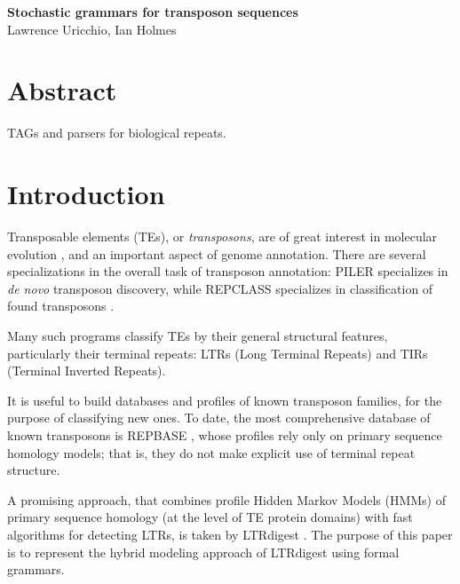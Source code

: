 \documentclass[10pt]{article}
\date{}
\newcommand\titlestring{Stochastic grammars for transposon sequences}
\newcommand\authorstring{
Lawrence Uricchio, Ian Holmes
}
\begin{document}
\begin{flushleft}
  {\Large
    \textbf{\titlestring}
  }
\\
\authorstring
\end{flushleft}


\section*{Abstract}
TAGs and parsers for biological repeats.

\tableofcontents



\section{Introduction}

Transposable elements (TEs), or {\em transposons}, are of great interest in molecular evolution \cite{Feschotte2007}, and an important aspect of genome annotation.
There are several specializations in the overall task of transposon annotation:
PILER \cite{EdgarMyers2005} specializes in {\em de novo} transposon discovery,
while REPCLASS specializes in classification of found transposons \cite{FeschotteKeswaniEtAl2009}.

Many such programs classify TEs by their general structural features, particularly their terminal repeats:
LTRs (Long Terminal Repeats) and TIRs (Terminal Inverted Repeats).

It is useful to build databases and profiles of known transposon families, for the purpose of classifying new ones.
To date, the most comprehensive database of known transposons is REPBASE \cite{KapitonovJurka2008},
whose profiles rely only on primary sequence homology models;
that is, they do not make explicit use of terminal repeat structure.

A promising approach, that combines profile Hidden Markov Models (HMMs) of primary sequence homology (at the level of TE protein domains)
with fast algorithms for detecting LTRs,
is taken by LTRdigest \cite{pmid19786494}.
The purpose of this paper is to represent the hybrid modeling approach of LTRdigest using formal grammars.
\end{document}

